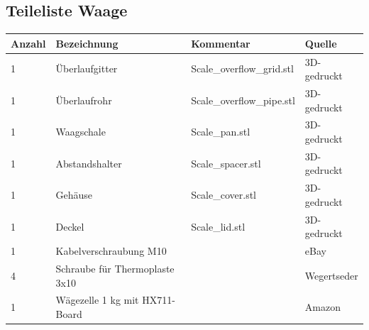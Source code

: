 \documentclass[12pt,letterpaper]{article}
\begin{document}
    \subsection{Teileliste Waage}
        \begin{tabular}{|l|l|l|l|}
    \hline
        Anzahl & Bezeichnung & Kommentar & Quelle \\ \hline
        1 & Überlaufgitter & Scale\_overflow\_grid.stl & 3D-gedruckt \\ \hline
        1 & Überlaufrohr & Scale\_overflow\_pipe.stl & 3D-gedruckt \\ \hline
        1 & Waagschale & Scale\_pan.stl & 3D-gedruckt \\ \hline
        1 & Abstandshalter & Scale\_spacer.stl & 3D-gedruckt \\ \hline
        1 & Gehäuse & Scale\_cover.stl & 3D-gedruckt \\ \hline
        1 & Deckel & Scale\_lid.stl & 3D-gedruckt \\ \hline
        1 & Kabelverschraubung M10 & ~ & eBay \\ \hline
        4 & Schraube für Thermoplaste 3x10 & ~ & Wegertseder \\ \hline
        1 & Wägezelle 1 kg mit HX711-Board & ~ & Amazon \\ \hline
    \end{tabular}
	
	\newpage
	
\end{document}
